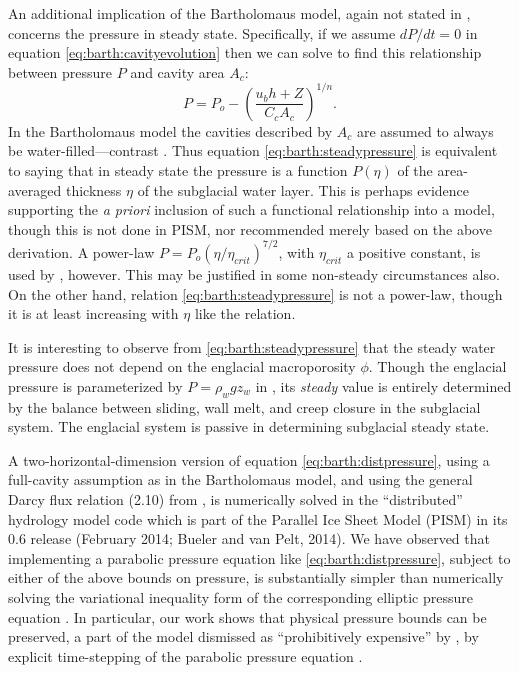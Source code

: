 \documentclass[review,letterpaper]{igs}
\begin{document}
An additional implication of the Bartholomaus model, again not stated in \cite{Bartholomausetal2011}, concerns the pressure in steady state.  Specifically, if we assume $dP/dt=0$ in equation \eqref{eq:barth:cavityevolution} then we can solve to find this relationship between pressure $P$ and cavity area $A_c$:
\begin{equation}
P = P_o - \left(\frac{u_b h + Z}{C_c A_c}\right)^{1/n}. \label{eq:barth:steadypressure}
\end{equation}
In the Bartholomaus model the cavities described by $A_c$ are assumed to always be water-filled---contrast \citep{Schoofetal2012}.  Thus equation \eqref{eq:barth:steadypressure} is equivalent to saying that in steady state the pressure is a function $P(\eta)$ of the area-averaged thickness $\eta$ of the subglacial water layer.  This is perhaps evidence supporting the \emph{a priori} inclusion of such a functional relationship into a model, though this is not done in PISM, nor recommended merely based on the above derivation.  A power-law $P = P_o (\eta/\eta_{crit})^{7/2}$, with $\eta_{crit}$ a positive constant, is used by \cite{FlowersClarke2002_theory}, however.  This may be justified in some non-steady circumstances also.  On the other hand, relation \eqref{eq:barth:steadypressure} is not a power-law, though it is at least increasing with $\eta$ like the \cite{FlowersClarke2002_theory} relation.

It is interesting to observe from \eqref{eq:barth:steadypressure} that the steady water pressure does not depend on the englacial macroporosity $\phi$.  Though the englacial pressure is parameterized by $P=\rho_w g z_w$ in \cite{Bartholomausetal2011}, its \emph{steady} value is entirely determined by the balance between sliding, wall melt, and creep closure in the subglacial system.  The englacial system is passive in determining subglacial steady state.

A two-horizontal-dimension version of equation \eqref{eq:barth:distpressure}, using a full-cavity assumption as in the Bartholomaus model, and using the general Darcy flux relation (2.10) from \cite{Schoofetal2012}, is numerically solved in the ``distributed'' hydrology model code which is part of the Parallel Ice Sheet Model (PISM) in its 0.6 release (February 2014; Bueler and van Pelt, 2014)\nocite{BuelervanPeltDRAFT}.  We have observed that implementing a parabolic pressure equation like \eqref{eq:barth:distpressure}, subject to either of the above bounds on pressure, is substantially simpler than numerically solving the variational inequality form of the corresponding elliptic pressure equation \citep{Schoofetal2012}.  In particular, our work shows that physical pressure bounds can be preserved, a part of the model dismissed as ``prohibitively expensive'' by \cite{Werderetal2013}, by explicit time-stepping of the parabolic pressure equation \cite{BuelervanPeltDRAFT}.
\end{document}
